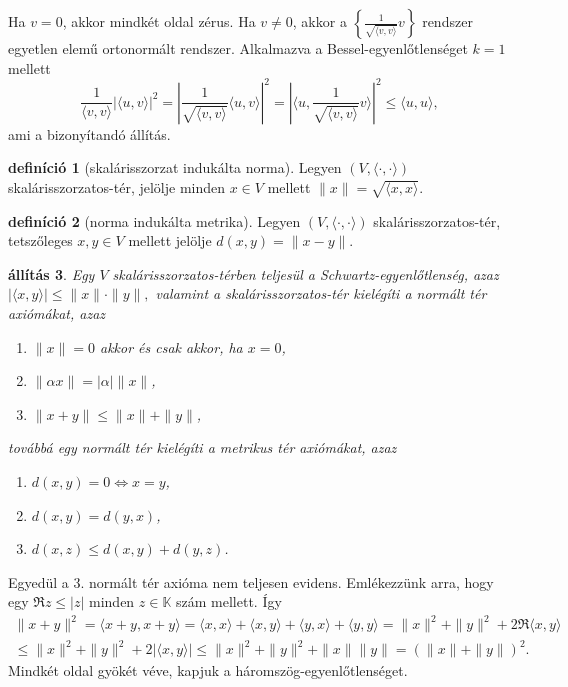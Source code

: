 \documentclass[a4paper, showtrims]{memoir}
\makeatletter
\renewenvironment{proof}[1][\proofname]
    {\par\pushQED{\qed}%
    \normalfont \topsep6\p@\@plus6\p@\relax
    \trivlist
    \item[\hskip\labelsep
        \itshape
    #1\@addpunct{:}]\ignorespaces}
    {\popQED\endtrivlist\@endpefalse}
\theoremstyle{plain}
\newtheorem{proposition}{állítás}[chapter]
\theoremstyle{remark}
\theoremstyle{definition}
\newtheorem{definition}[proposition]{definíció}
\newcommand{\ip}[2]{\langle#1,#2\rangle}
\makeatother
\begin{document}
\begin{proof}
	Ha $v=0$, akkor mindkét oldal zérus.
	Ha $v\neq 0$, akkor a $\left\{ \frac{1}{\sqrt{\ip{v}{v}}}v \right\}$ rendszer egyetlen elemű ortonormált rendszer.
	Alkalmazva a Bessel-egyenlőtlenséget $k=1$ mellett
	\[
		\frac{1}{\ip{v}{v}}
		\left|\ip{u}{v}\right|^2
		=
		\left|\frac{1}{\sqrt{\ip{v}{v}}}
		\ip{u}{v}\right|^2
		=
		\left|\ip{u}{\frac{1}{\sqrt{\ip{v}{v}}}v}\right|^2
		\leq \ip{u}{u},
	\]
	ami a bizonyítandó állítás.
\end{proof}
\begin{definition}[skalárisszorzat indukálta norma]
	Legyen $\left( V,\ip{\cdot}{\cdot} \right)$ skalárisszorzatos-tér,
	jelölje minden $x\in V$ mellett $\|x\|=\sqrt{\ip{x}{x}}$.
\end{definition}
\begin{definition}[norma indukálta metrika]
	Legyen $\left( V,\ip{\cdot}{\cdot} \right)$ skalárisszorzatos-tér,
	tetszőleges $x,y\in V$ mellett jelölje $d\left( x,y \right)=\|x-y\|$.
\end{definition}


\begin{proposition}
	Egy $V$ skalárisszorzatos-térben teljesül a \emph{Schwartz-egyenlőtlenség}, azaz
	\(|\ip{x}{y}|\leq\|x\|\cdot\|y\|,\)
	valamint a skalárisszorzatos-tér kielégíti a \emph{normált tér} axiómákat, azaz
	\begin{enumerate}
		\item $\|x\|=0$ akkor és csak akkor, ha $x=0$,
		\item $\|\alpha x\|=|\alpha|\|x\|$,
		\item $\|x+y\|\leq\|x\|+\|y\|$,
	\end{enumerate}
	továbbá egy normált tér kielégíti a \emph{metrikus tér} axiómákat, azaz
	\begin{enumerate}
		\item $d\left( x,y \right)=0\iff x=y$,
		\item $d\left( x,y \right)=d\left( y,x \right)$,
		\item $d\left( x,z \right)\leq d\left( x,y \right)+d\left( y,z \right)$.
		      \qedhere
	\end{enumerate}
\end{proposition}
\begin{proof}
	Egyedül a 3. normált tér axióma nem teljesen evidens.
	Emlékezzünk arra, hogy egy $\Re z\leq |z|$ minden $z\in\mathbb{K}$ szám mellett.
	Így
	\begin{multline*}
		\|x+y\|^2
		=
		\ip{x+y}{x+y}
		=
		\ip{x}{x}+\ip{x}{y}+\ip{y}{x}+\ip{y}{y}
		=\|x\|^2+\|y\|^2+2\Re\ip{x}{y}
		\\
		\leq
		\|x\|^2+\|y\|^2+2|\ip{x}{y}|
		\leq
		\|x\|^2+\|y\|^2+\|x\|\|y\|
		=\left( \|x\|+\|y\| \right)^2.
	\end{multline*}
	Mindkét oldal gyökét véve, kapjuk a háromszög-egyenlőtlenséget.
\end{proof}
\end{document}
